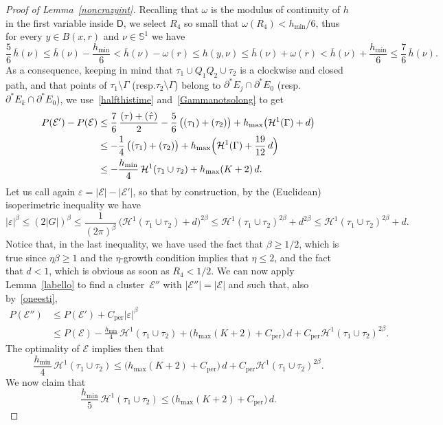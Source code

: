 \documentclass[11pt]{article}
\newcommand{\resp}{resp.\xspace}
\numberwithin{equation}{section}
\newcommand{\NoChangel}[1]{%
\expandafter\let\csname old\string#1\endcsname=#1
\let#1=\relax
\newcommand{#1}{\mathcode`l="716C\csname old\string#1\endcsname\mathcode`l="7160 }%
}
\renewcommand\S{\mathbb{S}}
\newcommand\Ceeb{C_\mathrm{per}}
\newcommand\len{\mathrm{len}}\NoChangel{\len}
\let\eps\varepsilon
\newcommand\E{\mathcal{E}}
\renewcommand\H{\mathcal{H}}
\theoremstyle{plain}
\theoremstyle{definition}
\begin{document}
\begin{proof}[Proof of Lemma~\ref{noncrazyint}]
Recalling that $\omega$ is the modulus of continuity of $h$ in the first variable inside $\mathsf{D}$, we select $R_4$ so small that $\omega(R_4)< h_{\min}/6$, thus for every $y\in B(x,r)$ and $\nu\in\S^1$ we have
\[
\frac 56\, \overline h(\nu) \leq \overline h(\nu)- \frac{h_{\min}}6<\overline h(\nu)- \omega(r) \leq h(y,\nu) \leq \overline h(\nu) + \omega(r)< \overline h(\nu) + \frac{h_{\min}}6 \leq \frac 76\,\overline h(\nu).
\]
As a consequence, keeping in mind that $\tau_1\cup Q_1Q_2\cup\tau_2$ is a clockwise and closed path, and that points of $\tau_1\setminus \Gamma$ (\resp $\tau_2\setminus\Gamma$) belong to $\partial^* E_j\cap\partial^* E_0$ (\resp $\partial^* E_k\cap \partial^* E_0$), we use~\eqref{halfthistime} and~\eqref{Gammanotsolong} to get
\begin{align}
P(\E')-P(\E)&\leq \frac 76\,\frac{\len(\tau)+\len(\hat\tau)}2 - \frac 56\, \big(\len(\tau_1) +\len(\tau_2)\big)+ h_{\max} \big(\H^1(\Gamma)+d\big)\notag\\
&\leq -\frac 14\, \big(\len(\tau_1) +\len(\tau_2)\big)+ h_{\max} \Bigl(\H^1(\Gamma)+\frac{19}{12}\,d\Bigr)\label{oneesti}\\
& \leq -\frac {h_{\min}}4\, \H^1(\tau_1\cup\tau_2) + h_{\max} (K+2)\,d.\notag
\end{align}
Let us call again $\eps=|\E|-|\E'|$, so that by construction, by the (Euclidean) isoperimetric inequality we have
\[
|\eps|^\beta \leq (2 |G|)^\beta \leq \frac 1{(2\pi)^\beta} \, \big(\H^1(\tau_1 \cup\tau_2)+d\big)^{2\beta}\leq
\H^1(\tau_1 \cup\tau_2)^{2\beta}+d^{2\beta}
\leq \H^1(\tau_1 \cup\tau_2)^{2\beta}+d.
\]
Notice that, in the last inequality, we have used the fact that $\beta\geq 1/2$, which is true since $\eta\beta\geq 1$ and the $\eta$-growth condition implies that $\eta\leq 2$, and the fact that $d<1$, which is obvious as soon as $R_4<1/2$. We can now apply Lemma~\ref{labello} to find a cluster~$\E''$ with $|\E''|=|\E|$ and such that, also by~\eqref{oneesti},
\[\begin{split}
P(\E'') &\leq P(\E') + \Ceeb |\eps|^\beta\\
&\leq P(\E) -\frac{h_{\min}}4\,\H^1(\tau_1 \cup\tau_2)+ \Big(h_{\max} (K+2)+ \Ceeb\Big)\,d + \Ceeb \H^1(\tau_1 \cup\tau_2)^{2\beta}.
\end{split}\]
The optimality of $\E$ implies then that
\[
\frac{h_{\min}}4\,\H^1(\tau_1 \cup\tau_2)\leq \Big(h_{\max} (K+2)+ \Ceeb\Big)\,d + \Ceeb \H^1(\tau_1 \cup\tau_2)^{2\beta}.
\]
We now claim that
\begin{equation}\label{sinceopt}
\frac{h_{\min}}5\,\H^1(\tau_1 \cup\tau_2)\leq \Big(h_{\max} (K+2)+ \Ceeb\Big)\,d.

\end{equation}
\end{proof}
\end{document}
